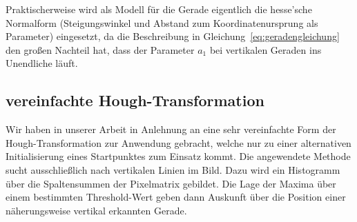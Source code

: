 Praktischerweise wird als Modell für die Gerade eigentlich die hesse'sche Normalform (Steigungswinkel und Abstand zum Koordinatenursprung als Parameter) eingesetzt, da die Beschreibung in Gleichung~\ref{eq:geradengleichung} den großen Nachteil hat, dass der Parameter \( a_1 \) bei vertikalen Geraden ins Unendliche läuft. 

\subsection{vereinfachte Hough-Transformation}
\label{ssec:grundlagen:hough:vereinfachte}
Wir haben in unserer Arbeit in Anlehnung an \autocite{alyRealTimeDetection2008} eine sehr vereinfachte Form der Hough-Transformation zur Anwendung gebracht, welche nur zu einer alternativen Initialisierung eines Startpunktes zum Einsatz kommt. Die angewendete Methode sucht ausschließlich nach vertikalen Linien im Bild. Dazu wird ein Histogramm über die Spaltensummen der Pixelmatrix gebildet. Die Lage der Maxima über einem bestimmten Threshold-Wert geben dann Auskunft über die Position einer näherungsweise vertikal erkannten Gerade.